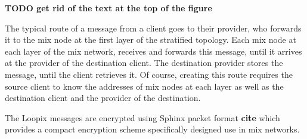 \documentclass[a4paper,11pt,oneside]{report}
\begin{document}
\textbf{TODO get rid of the text at the top of the figure}

The typical route of a message from a client goes to their provider, who forwards it to the mix node at the first layer of the stratified topology. Each mix node at each layer of the mix network, receives and forwards this message, until it arrives at the provider of the destination client. The destination provider stores the message, until the client retrieves it. Of course, creating this route requires the source client to know the addresses of mix nodes at each layer as well as the destination client and the provider of the destination.

The Loopix messages are encrypted using Sphinx packet format \textbf{cite} which provides a compact encryption scheme specifically designed use in mix networks.
\end{document}

